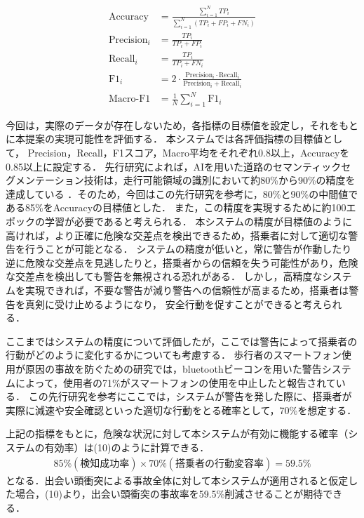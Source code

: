\documentclass[uplatex,dvipdfmx]{jsarticle}
\begin{document}
\begin{align}
\mathrm{Accuracy} &= \frac{\sum_{i=1}^{N} TP_i}{\sum_{i=1}^{N} (TP_i + FP_i + FN_i)} \\
\mathrm{Precision}_i &= \frac{TP_i}{TP_i + FP_i} \\
\mathrm{Recall}_i &= \frac{TP_i}{TP_i + FN_i} \\
\mathrm{F1}_i &= 2 \cdot \frac{\mathrm{Precision}_i \cdot \mathrm{Recall}_i}{\mathrm{Precision}_i + \mathrm{Recall}_i} \\
\mathrm{Macro\text{-}F1} &= \frac{1}{N} \sum_{i=1}^{N} \mathrm{F1}_i
\end{align}

今回は，実際のデータが存在しないため，各指標の目標値を設定し，それをもとに本提案の実現可能性を評価する．
本システムでは各評価指標の目標値として，
Precision，Recall，F1スコア，Macro平均をそれぞれ0.8以上，Accuracyを0.85以上に設定する．
先行研究によれば，AIを用いた道路のセマンティックセグメンテーション技術は，走行可能領域の識別において約80\%から90\%の精度を達成している
\cite{ref:road_segmentation}．そのため，今回はこの先行研究を参考に，80\%と90\%の中間値である85\%をAccuracyの目標値とした．
また，この精度を実現するために約100エポックの学習が必要であると考えられる．
本システムの精度が目標値のように高ければ，より正確に危険な交差点を検出できるため，搭乗者に対して適切な警告を行うことが可能となる．
システムの精度が低いと，常に警告が作動したり逆に危険な交差点を見逃したりと，搭乗者からの信頼を失う可能性があり，危険な交差点を検出しても警告を無視される恐れがある．
しかし，高精度なシステムを実現できれば，不要な警告が減り警告への信頼性が高まるため，搭乗者は警告を真剣に受け止めるようになり，
安全行動を促すことができると考えられる．

ここまではシステムの精度について評価したが，ここでは警告によって搭乗者の行動がどのように変化するかについても考慮する．
歩行者のスマートフォン使用が原因の事故を防ぐための研究では，bluetoothビーコンを用いた警告システムによって，使用者の71\%がスマートフォンの使用を中止したと報告されている\cite{ref:user_alert}．
この先行研究を参考にここでは，システムが警告を発した際に、搭乗者が実際に減速や安全確認といった適切な行動をとる確率として，70\%を想定する．

上記の指標をもとに，危険な状況に対して本システムが有効に機能する確率（システムの有効率）は(10)のように計算できる．
\begin{align}
85\% (検知成功率) × 70\% (搭乗者の行動変容率) = 59.5\%
\end{align}
となる．出会い頭衝突による事故全体に対して本システムが適用されると仮定した場合，(10)より，出会い頭衝突の事故率を59.5\%削減させることが期待できる．
\end{document}
